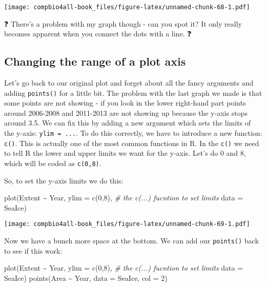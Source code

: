 \documentclass[
]{book}
\newenvironment{Shaded}{\begin{snugshade}}{\end{snugshade}}
\newcommand{\AttributeTok}[1]{\textcolor[rgb]{0.77,0.63,0.00}{#1}}
\newcommand{\CommentTok}[1]{\textcolor[rgb]{0.56,0.35,0.01}{\textit{#1}}}
\newcommand{\DecValTok}[1]{\textcolor[rgb]{0.00,0.00,0.81}{#1}}
\newcommand{\FunctionTok}[1]{\textcolor[rgb]{0.00,0.00,0.00}{#1}}
\newcommand{\NormalTok}[1]{#1}
\newcommand{\SpecialCharTok}[1]{\textcolor[rgb]{0.00,0.00,0.00}{#1}}
\begin{document}
\texttt{[image: compbio4all-book\_files/figure-latex/unnamed-chunk-68-1.pdf]}

❓ There's a problem with my graph though - can you spot it? It only really becomes apparent when you connect the dots with a line. ❓

\hypertarget{changing-the-range-of-a-plot-axis}{%
\subsection{Changing the range of a plot axis}\label{changing-the-range-of-a-plot-axis}}

Let's go back to our original plot and forget about all the fancy arguments and adding \texttt{points()} for a little bit. The problem with the last graph we made is that some points are not showing - if you look in the lower right-hand part points around 2006-2008 and 2011-2013 are not showing up because the y-axis stops around 3.5. We can fix this by adding a new argument which sets the limits of the y-axis: \texttt{ylim\ =\ ...}. To do this correctly, we have to introduce a new function: \texttt{c()}. This is actually one of the most common functions in R. In the \texttt{c()} we need to tell R the lower and upper limits we want for the y-axis. Let's do 0 and 8, which will be coded as \texttt{c(0,8)}.

So, to set the y-axis limits we do this:

\begin{Shaded}
\begin{Highlighting}[]
\FunctionTok{plot}\NormalTok{(Extent }\SpecialCharTok{\textasciitilde{}}\NormalTok{ Year,  }
     \AttributeTok{ylim =} \FunctionTok{c}\NormalTok{(}\DecValTok{0}\NormalTok{,}\DecValTok{8}\NormalTok{), }\CommentTok{\# the c(...) fucntion to set limits}
     \AttributeTok{data =}\NormalTok{ SeaIce) }
\end{Highlighting}
\end{Shaded}

\texttt{[image: compbio4all-book\_files/figure-latex/unnamed-chunk-69-1.pdf]}

Now we have a bunch more space at the bottom. We can add our \texttt{points()} back to see if this work:

\begin{Shaded}
\begin{Highlighting}[]
\FunctionTok{plot}\NormalTok{(Extent }\SpecialCharTok{\textasciitilde{}}\NormalTok{ Year,  }
     \AttributeTok{ylim =} \FunctionTok{c}\NormalTok{(}\DecValTok{0}\NormalTok{,}\DecValTok{8}\NormalTok{), }\CommentTok{\# the c(...) fucntion to set limits}
     \AttributeTok{data =}\NormalTok{ SeaIce) }
\FunctionTok{points}\NormalTok{(Area }\SpecialCharTok{\textasciitilde{}}\NormalTok{ Year,}
      \AttributeTok{data =}\NormalTok{ SeaIce,}
      \AttributeTok{col =} \DecValTok{2}\NormalTok{)}
\end{Highlighting}
\end{Shaded}
\end{document}
